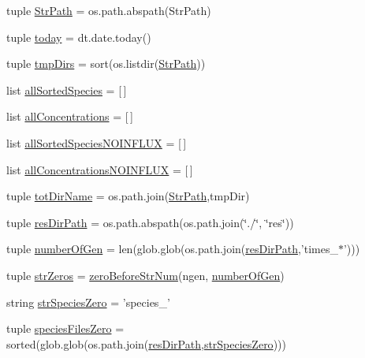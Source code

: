\begin{DoxyCompactItemize}
\item 
tuple \hyperlink{a00097_a1d168f4d444ea1d02f186a7568344fba}{Str\-Path} = os.\-path.\-abspath(Str\-Path)
\item 
tuple \hyperlink{a00097_af30cd903eabfe4c9167f2a5d0062a4ce}{today} = dt.\-date.\-today()
\item 
tuple \hyperlink{a00097_a4f312756a4e405be853b0a84be7e2e54}{tmp\-Dirs} = sort(os.\-listdir(\hyperlink{a00097_a1d168f4d444ea1d02f186a7568344fba}{Str\-Path}))
\item 
list \hyperlink{a00097_aceddba8afb0eb0cc7ba102491a9a3c30}{all\-Sorted\-Species} = \mbox{[}$\,$\mbox{]}
\item 
list \hyperlink{a00097_a8c439282d32e80d2e2d4c02cc36f1101}{all\-Concentrations} = \mbox{[}$\,$\mbox{]}
\item 
list \hyperlink{a00097_a48013e92108a94a85d1e32c2397eb37c}{all\-Sorted\-Species\-N\-O\-I\-N\-F\-L\-U\-X} = \mbox{[}$\,$\mbox{]}
\item 
list \hyperlink{a00097_af6dd7a5a396717328c091d96d629af7c}{all\-Concentrations\-N\-O\-I\-N\-F\-L\-U\-X} = \mbox{[}$\,$\mbox{]}
\item 
tuple \hyperlink{a00097_aeed4ca0c266fb5e31aebbbbe2f389378}{tot\-Dir\-Name} = os.\-path.\-join(\hyperlink{a00097_a1d168f4d444ea1d02f186a7568344fba}{Str\-Path},tmp\-Dir)
\item 
tuple \hyperlink{a00097_a28ca19f0f566396ef664e068a41a2837}{res\-Dir\-Path} = os.\-path.\-abspath(os.\-path.\-join(\char`\"{}./\char`\"{}, \char`\"{}res\char`\"{}))
\item 
tuple \hyperlink{a00097_a28cc280ff54c726bd790cf781d3bab8c}{number\-Of\-Gen} = len(glob.\-glob(os.\-path.\-join(\hyperlink{a00097_a28ca19f0f566396ef664e068a41a2837}{res\-Dir\-Path},'times\-\_\-$\ast$')))
\item 
tuple \hyperlink{a00097_a9401cc8fb642e77e034e21ef9babcb24}{str\-Zeros} = \hyperlink{a00097_a52efd37e3719214b7a4c7c46842ae229}{zero\-Before\-Str\-Num}(ngen, \hyperlink{a00097_a28cc280ff54c726bd790cf781d3bab8c}{number\-Of\-Gen})
\item 
string \hyperlink{a00097_aea2d717887265b294c623099d2495d4f}{str\-Species\-Zero} = 'species\-\_\-'
\item 
tuple \hyperlink{a00097_a4657fd3a80cf1c76ab075d62d8de3bf3}{species\-Files\-Zero} = sorted(glob.\-glob(os.\-path.\-join(\hyperlink{a00097_a28ca19f0f566396ef664e068a41a2837}{res\-Dir\-Path},\hyperlink{a00097_aea2d717887265b294c623099d2495d4f}{str\-Species\-Zero})))

\end{DoxyCompactItemize}
